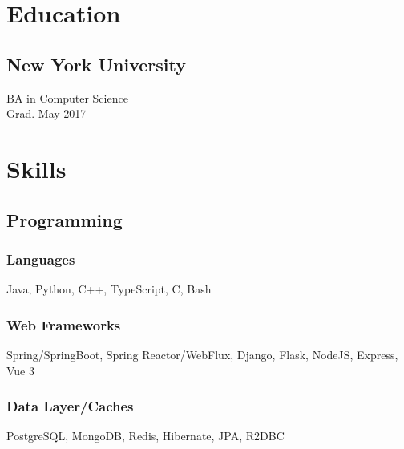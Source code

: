 \documentclass[]{two-column-resume}
\begin{document}
\begin{minipage}[t]{0.34\textwidth}

%
\section{Education}

\subsection{New York University}
BA in Computer Science \\
Grad. May 2017 \\


    \sectionsep

%
\section{Skills}
\setlength{\parindent}{3ex}
\subsection{Programming}

    \subsubsection{Languages}
            Java, 
            Python, 
            C++, 
            TypeScript, 
            C, 
            Bash
        \newline
    \subsubsection{Web Frameworks}
            Spring/SpringBoot, 
            Spring Reactor/WebFlux, 
            Django, 
            Flask, 
            NodeJS, 
            Express, 
            Vue 3
        \newline
    \subsubsection{Data Layer/Caches}
            PostgreSQL, 
            MongoDB, 
            Redis, 
            Hibernate, 
            JPA, 
            R2DBC
        \newline

\end{minipage}
\end{document}
